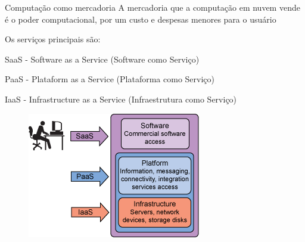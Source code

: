 \begin{frame}{Computação como mercadoria}
    A mercadoria que a computação em nuvem vende é o poder computacional, por um
    custo e despesas menores para o usuário

    Os serviços principais são:
    \begin{itemise}
        \item<2-> SaaS - Software as a Service (Software como Serviço) 
        \item<3-> PaaS - Plataform as a Service (Plataforma como Serviço) 
        \item<4-> IaaS - Infrastructure as a Service (Infraestrutura como Serviço) 
    \end{itemise}
    
    \begin{figure}
        \includegraphics[scale=0.5]{image/layers.png}
    \end{figure}

\end{frame}
